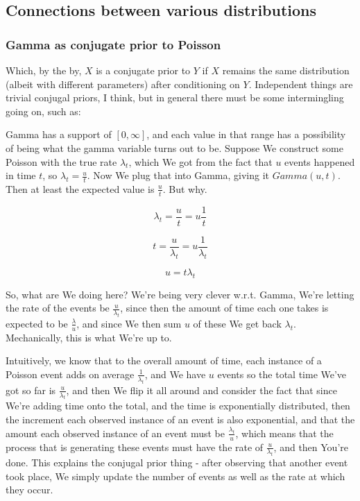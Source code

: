 \documentclass{article}
\begin{document}
	\subsection{Connections between various distributions}
	
		\subsubsection{Gamma as conjugate prior to Poisson}
		
		Which, by the by, $X$ is a conjugate prior to $Y$ if $X$ remains the same distribution (albeit with different parameters) after conditioning on $Y$. Independent things are trivial conjugal priors, I think, but in general there must be some intermingling going on, such as:
		
		Gamma has a support of $[0, \infty]$, and each value in that range has a possibility of being what the gamma variable turns out to be. Suppose We construct some Poisson with the true rate $\lambda_t$, which We got from the fact that $u$ events happened in time $t$, so $\lambda_t = \frac{u}{t}$. Now We plug that into Gamma, giving it $Gamma(u, t)$. Then at least the expected value is $\frac{u}{t}$. But why. 
		
		\[ \lambda_t = \frac{u}{t} = u\frac{1}{t}\]
		
		\[ t = \frac{u}{\lambda_t} = u\frac{1}{\lambda_t} \]
		
		\[ u = t\lambda_t  \]		
		
		So, what are We doing here? We're being very clever w.r.t. Gamma, We're letting the rate of the events be $\frac{u}{\lambda_t}$, since then the amount of time each one takes is expected to be $\frac{\lambda}{u}$, and since We then sum $u$ of these We get back $\lambda_t$. Mechanically, this is what We're up to.
		
		Intuitively, we know that to the overall amount of time, each instance of a Poisson event adds on average $\frac{1}{\lambda_t}$, and We have $u$ events so the total time We've got so far is $\frac{u}{\lambda_t}$, and then We flip it all around and consider the fact that since We're adding time onto the total, and the time is exponentially distributed, then the increment each observed instance of an event is also exponential, and that the amount each observed instance of an event must be $\frac{\lambda_t}{u}$, which means that the process that is generating these events must have the rate of $\frac{u}{\lambda_t}$, and then You're done. This explains the conjugal prior thing - after observing that another event took place, We simply update the number of events as well as the rate at which they occur.
		
\end{document}
